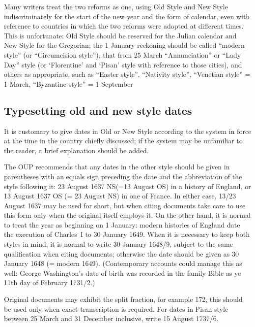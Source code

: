 Many writers treat the two reforms as one, using Old Style
and New Style indiscriminately for the start of the new year and the
form of calendar, even with reference to countries in which the two
reforms were adopted at different times. This is unfortunate: Old Style
should be reserved for the Julian calendar and New Style for the Gregorian;
the 1 January reckoning should be called \enquote{modern style} (or \enquote{Circumcision style}), that from 25 March \enquote{Annunciation} or \enquote{Lady Day} style (or
\enquote*{Florentine} and \enquote*{Pisan} style with reference to those cities), and others
as appropriate, such as \enquote{Easter style}, \enquote{Nativity style}, \enquote{Venetian style} =
1 March, \enquote{Byzantine style} = 1 September

\subsection{Typesetting old and new style dates}

It is customary to give dates in Old or New Style according to the system
in force at the time in the country chiefly discussed; if the system may be
unfamiliar to the reader, a brief explanation should be added.

The OUP recommends that any dates in the other style should be given in parentheses with an equals sign
preceding the date and the abbreviation of the style following it: 23
August 1637 NS(=13 August OS) in a history of England, or 13 August 1637
OS (= 23 August NS) in one of France. In either case, 13/23 August 1637 may
be used for short, but when citing documents take care to use this form
only when the original itself employs it. On the other hand, it is normal
to treat the year as beginning on 1 January: modern histories of England
date the execution of Charles~I to 30 January 1649. When it is necessary to
keep both styles in mind, it is normal to write 30 January 1648/9, subject to
the same qualification when citing documents; otherwise the date
should be given as 30 January 1648 (= modern 1649). (Contemporary accounts
could manage this as well: George Washington's date of birth was
recorded in the family Bible as ye 11th day of February 1731/2.) 

Original
documents may exhibit the split fraction, for example 172, this should
be used only when exact transcription is required. For dates in Pisan style
between 25 March and 31 December inclusive, write 15 August 1737/6. 









